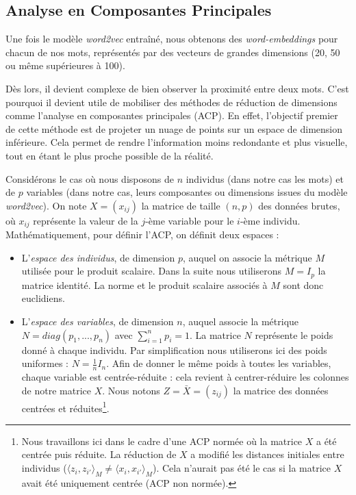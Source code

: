 \documentclass[11pt,french,french]{article}
\let\rmarkdownfootnote\footnote%
\def\footnote{\protect\rmarkdownfootnote}
\begin{document}
\subsection{Analyse en Composantes
Principales}\label{analyse-en-composantes-principales}

Une fois le modèle \emph{word2vec} entraîné, nous obtenons des
\emph{word-embeddings} pour chacun de nos mots, représentés par des
vecteurs de grandes dimensions (20, 50 ou même supérieures à 100).

Dès lors, il devient complexe de bien observer la proximité entre deux
mots. C'est pourquoi il devient utile de mobiliser des méthodes de
réduction de dimensions comme l'analyse en composantes principales
(ACP). En effet, l'objectif premier de cette méthode est de projeter un
nuage de points sur un espace de dimension inférieure. Cela permet de
rendre l'information moins redondante et plus visuelle, tout en étant le
plus proche possible de la réalité.

Considérons le cas où nous disposons de \(n\) individus (dans notre cas
les mots) et de \(p\) variables (dans notre cas, leurs composantes ou
dimensions issues du modèle \emph{word2vec}). On note \(X = (x_{ij})\)
la matrice de taille \((n,p)\) des données brutes, où \(x_{ij}\)
représente la valeur de la \(j\)-ème variable pour le \(i\)-ème
individu. Mathématiquement, pour définir l'ACP, on définit deux espaces
:

\begin{itemize}
\item
  L'\emph{espace des individus}, de dimension \(p\), auquel on associe
  la métrique \(M\) utilisée pour le produit scalaire. Dans la suite
  nous utiliserons \(M =I_p\) la matrice identité. La norme et le
  produit scalaire associés à \(M\) sont donc euclidiens.
\item
  L'\emph{espace des variables}, de dimension \(n\), auquel associe la
  métrique \(N=diag(p_1,...,p_n)\) avec \(\sum_{i=1}^np_i=1\). La
  matrice \(N\) représente le poids donné à chaque individu. Par
  simplification nous utiliserons ici des poids uniformes :
  \(N=\frac{1}{n}I_n\). Afin de donner le même poids à toutes les
  variables, chaque variable est centrée-réduite : cela revient à
  centrer-réduire les colonnes de notre matrice \(X\). Nous notons
  \(Z =\bar X= (z_{ij})\) la matrice des données centrées et
  réduites\footnote{Nous travaillons ici dans le cadre d'une ACP normée
    où la matrice \(X\) a été centrée puis réduite. La réduction de
    \(X\) a modifié les distances initiales entre individus
    (\(\langle z_i,z_{i'}\rangle_M \neq \langle x_i,x_{i'}\rangle_M\)).
    Cela n'aurait pas été le cas si la matrice \(X\) avait été
    uniquement centrée (ACP non normée).}.
\end{itemize}
\end{document}
